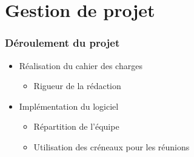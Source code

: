\documentclass{beamer}
\begin{document}

\section{Gestion de projet}

\begin{frame}
\frametitle{Déroulement du projet}
\begin{itemize}[label=$\bullet$]
\item Réalisation du cahier des charges
	\begin{itemize}[label=$\circ$]
	\item Rigueur de la rédaction
	\end{itemize}
\item Implémentation du logiciel
	\begin{itemize}[label=$\circ$]
	\item Répartition de l'équipe
	\item Utilisation des créneaux pour les réunions
	\end{itemize}
\end{itemize}

\end{frame}

\end{document}
